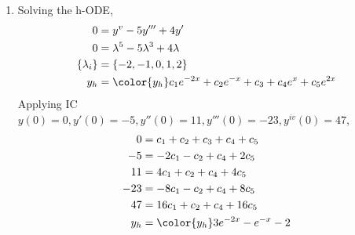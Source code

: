 \begin{enumerate}
    \item Solving the h-ODE,
          \begin{align}
              0               & = y^{v} - 5y''' + 4y'                            \\
              0               & = \lambda^{5} - 5\lambda^{3} + 4\lambda          \\
              \{\lambda_{i}\} & = \{-2, -1, 0, 1, 2\}                            \\
              y_{h}           & = \color{y_h} c_{1}e^{-2x} + c_{2}e^{-x} + c_{3}
              + c_{4}e^{x} + c_{5}e^{2x}
          \end{align}
          Applying IC $ y(0) = 0, y'(0) = -5, y''(0) = 11, y'''(0) = -23, y^{iv}(0) = 47 $,
          \begin{align}
              0     & = c_{1} + c_{2} + c_{3} + c_{4} + c_{5} \\
              -5    & = -2c_{1} - c_{2} + c_{4} + 2c_{5}      \\
              11    & = 4c_{1} + c_{2} + c_{4} + 4c_{5}       \\
              -23   & = -8c_{1} - c_{2} + c_{4} + 8c_{5}      \\
              47    & = 16c_{1} + c_{2} + c_{4} + 16c_{5}     \\
              y_{h} & = \color{y_h} 3e^{-2x} - e^{-x} - 2
          \end{align}
          \begin{figure}[H]
              \centering
          \end{figure}


\end{enumerate}
